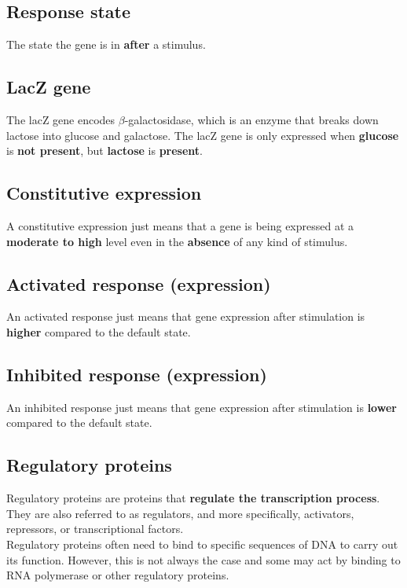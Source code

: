 \documentclass[11pt]{article}
\begin{document}
\subsection{Response state}
\label{sec:org8c0ec25}
The state the gene is in \textbf{after} a stimulus.

\subsection{LacZ gene}
\label{sec:org0bf723a}
The lacZ gene encodes \(\beta\)-galactosidase, which is an enzyme that breaks down lactose into glucose and galactose. The lacZ gene is only expressed when \textbf{glucose} is \textbf{not present}, but \textbf{lactose} is \textbf{present}.

\subsection{Constitutive expression}
\label{sec:orga9ef6a3}
A constitutive expression just means that a gene is being expressed at a \textbf{moderate to high} level even in the \textbf{absence} of any kind of stimulus.

\subsection{Activated response (expression)}
\label{sec:org84c9531}
An activated response just means that gene expression after stimulation is \textbf{higher} compared to the default state.

\subsection{Inhibited response (expression)}
\label{sec:org6883903}
An inhibited response just means that gene expression after stimulation is \textbf{lower} compared to the default state.

\subsection{Regulatory proteins}
\label{sec:orga2bf0f1}
Regulatory proteins are proteins that \textbf{regulate the transcription process}. They are also referred to as regulators, and more specifically, activators, repressors, or transcriptional factors.
\\[0pt]

Regulatory proteins often need to bind to specific sequences of DNA to carry out its function. However, this is not always the case and some may act by binding to RNA polymerase or other regulatory proteins.
\end{document}
